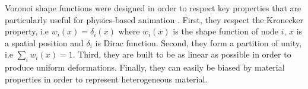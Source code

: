 Voronoi shape functions were designed in order to respect key properties that are particularly useful for physics-based animation \cite{Faure2011} . First, they respect the Kronecker property, i.e $w_{i}(x) = \delta_{i}(x)$ where $w_{i}(x)$ is the shape function of node $i$, $x$ is a spatial position and $\delta_{i}$ is Dirac function. Second, they form a partition of unity, i.e $\sum_{i}w_{i}(x) = 1$. Third, they are built to be as linear as possible in order to produce uniform deformations. Finally, they can easily be biased by material properties in order to represent heterogeneous material.

